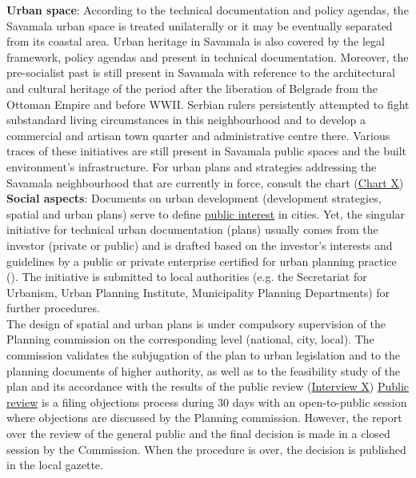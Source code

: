\documentclass[11pt]{report}
\begin{document}
\begin{itemize}
\textbf{Urban space}:
According to the technical documentation and policy agendas, the Savamala urban space is treated unilaterally or it may be eventually separated from its coastal area. Urban heritage in Savamala is also covered by the legal framework, policy agendas and present in technical documentation. Moreover, the pre-socialist past is still present in Savamala with reference to the architectural and cultural heritage of the period after the liberation of Belgrade from the Ottoman Empire and before WWII. 
Serbian rulers persistently attempted to fight substandard living circumstances in this neighbourhood and to develop a commercial and artisan town quarter and administrative centre there.
Various traces of these initiatives are still present in Savamala public spaces and the built environment’s infrastructure. For urban plans and strategies addressing the Savamala neighbourhood that are currently in force, consult the chart (\href{Chart Planovi CH5}{Chart X}) %
\\

\textbf{Social aspects}:
Documents on urban development (development strategies, spatial and urban plans) serve to define  \underline{public interest} in cities.
Yet, the singular initiative for technical urban documentation (plans) usually comes from the investor (private or public) and is drafted based on the investor's interests and guidelines by a public or private enterprise certified for urban planning practice (\href{ref}{\citealt{ministarstvo_prostora_urbani_2014}}). %
The initiative is submitted to local authorities (e.g. the Secretariat for Urbanism, Urban Planning Institute, Municipality Planning Departments) for further procedures.
\\

The design of spatial and urban plans is under compulsory supervision of the Planning commission on the corresponding level (national, city, local). The commission validates the subjugation of the plan to urban legislation and to the planning documents of higher authority, as well as to the feasibility study of the plan and its accordance with the results of the public review (\href{ref}{Interview X})
\underline{Public review} is a filing objections process during 30 days with an open-to-public session where objections are discussed by the Planning commission. However, the report over the review of the general public and the final decision is made in a closed session by the Commission. 
When the procedure is over, the decision is published in the local gazette.
\\


\end{itemize}
\end{document}

